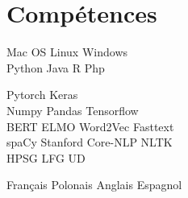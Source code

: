 \section{Compétences}

\sectionsep
 Mac OS \textbullet{} Linux \textbullet{} Windows \\
 Python \textbullet{}   Java \textbullet{} R \textbullet{} Php  

\sectionsep
Pytorch \textbullet{} Keras \\ 
Numpy \textbullet{} Pandas \textbullet{} Tensorflow \\
 
\sectionsep
 BERT \textbullet{} ELMO \textbullet{} Word2Vec \textbullet{} Fasttext \\
 spaCy \textbullet{} Stanford Core-NLP  \textbullet{} NLTK \\
 HPSG \textbullet{} LFG \textbullet{}  UD

\sectionsep
Français  \textbullet{} Polonais \textbullet{} Anglais \textbullet{} Espagnol \\

\sectionsep
